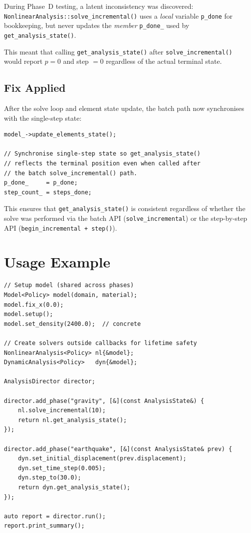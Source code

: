 During Phase~D testing, a latent inconsistency was discovered:
\texttt{NonlinearAnalysis::solve\_incremental()} uses a \emph{local}
variable \texttt{p\_done} for bookkeeping, but never updates the
\emph{member} \texttt{p\_done\_} used by \texttt{get\_analysis\_state()}.

This meant that calling \texttt{get\_analysis\_state()} after
\texttt{solve\_incremental()} would report $p = 0$ and step $= 0$
regardless of the actual terminal state.

\subsection{Fix Applied}

After the solve loop and element state update, the batch path now
synchronises with the single-step state:

\begin{verbatim}
model_->update_elements_state();

// Synchronise single-step state so get_analysis_state()
// reflects the terminal position even when called after
// the batch solve_incremental() path.
p_done_     = p_done;
step_count_ = steps_done;
\end{verbatim}

This ensures that \texttt{get\_analysis\_state()} is consistent
regardless of whether the solve was performed via the batch API
(\texttt{solve\_incremental}) or the step-by-step API
(\texttt{begin\_incremental + step()}).


\section{Usage Example}

\begin{verbatim}
// Setup model (shared across phases)
Model<Policy> model(domain, material);
model.fix_x(0.0);
model.setup();
model.set_density(2400.0);  // concrete

// Create solvers outside callbacks for lifetime safety
NonlinearAnalysis<Policy> nl{&model};
DynamicAnalysis<Policy>   dyn{&model};

AnalysisDirector director;

director.add_phase("gravity", [&](const AnalysisState&) {
    nl.solve_incremental(10);
    return nl.get_analysis_state();
});

director.add_phase("earthquake", [&](const AnalysisState& prev) {
    dyn.set_initial_displacement(prev.displacement);
    dyn.set_time_step(0.005);
    dyn.step_to(30.0);
    return dyn.get_analysis_state();
});

auto report = director.run();
report.print_summary();
\end{verbatim}

